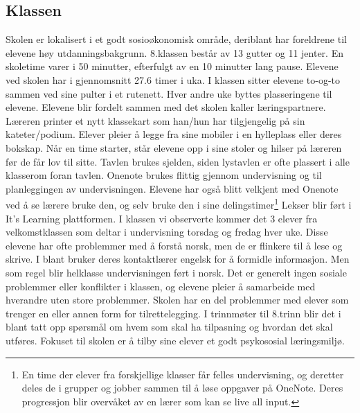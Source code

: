 \documentclass[main.tex]{subfiles}
\begin{document}
\subsection*{Klassen}
Skolen er lokalisert i et godt sosioøkonomisk område, deriblant har foreldrene 
til elevene høy utdanningsbakgrunn. 8.klassen består av 13 gutter og 11 jenter. 
En skoletime varer i 50 minutter, efterfulgt av en 10 minutter lang pause. Elevene 
ved skolen har i gjennomsnitt 27.6 timer i uka. I klassen sitter elevene to-og-to sammen 
ved sine pulter i et rutenett. Hver andre uke byttes plasseringene til elevene. 
Elevene blir fordelt sammen med det skolen kaller læringspartnere. Læreren printer 
et nytt klassekart som han/hun har tilgjengelig på sin kateter/podium. Elever pleier 
å legge fra sine mobiler i en hylleplass eller deres bokskap. Når en time starter, 
står elevene opp i sine stoler og hilser på læreren før de får lov til sitte. 
Tavlen brukes sjelden, siden lystavlen er ofte plassert i alle klasserom foran 
tavlen. Onenote brukes flittig gjennom undervisning og til planleggingen av 
undervisningen. Elevene har også blitt velkjent med Onenote ved å se lærere 
bruke den, og selv bruke den i sine delingstimer\footnote{En time der elever 
fra forskjellige klasser får felles undervisning, og deretter deles de i 
grupper og jobber sammen til å løse oppgaver på OneNote. Deres progressjon 
blir overvåket av en lærer som kan se live all input.} Lekser blir ført i 
It’s Learning plattformen. I klassen vi observerte kommer det 3 elever fra 
velkomstklassen som deltar i undervisning torsdag og fredag hver uke. 
Disse elevene har ofte problemmer med å forstå norsk, men de er flinkere 
til å lese og skrive. I blant bruker deres kontaktlærer engelsk for å 
formidle informasjon. Men som regel blir helklasse undervisningen ført 
i norsk. Det er generelt ingen sosiale problemmer eller konflikter i 
klassen, og elevene pleier å samarbeide med hverandre uten store problemmer. 
Skolen har en del problemmer med elever som trenger en eller annen 
form for tilrettelegging. I trinnmøter til 8.trinn blir det i blant 
tatt opp spørsmål om hvem som skal ha tilpasning og hvordan det skal 
utføres. Fokuset til skolen er å tilby sine elever et godt psykososial 
læringsmiljø.
\newline
\end{document}
